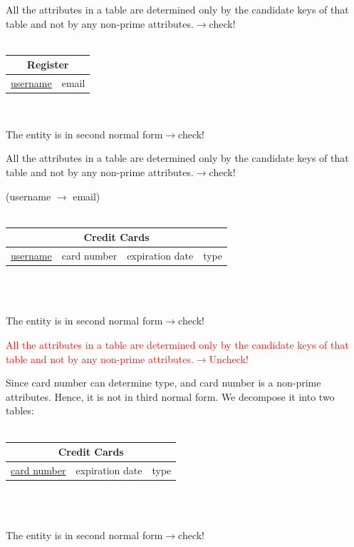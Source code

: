 \documentclass[12pt]{article}
\begin{document}
\par All the attributes in a table are determined only by the candidate keys of that table and not by any non-prime attributes.\hfill $\rightarrow$check!\\
~\\
\begin{tabularx}{\textwidth}{|X|X|}
\hline
\multicolumn{2}{|c|}{Register}\\\hline
\underline{username} & email\\\hline
\end{tabularx}
~\\
\par The entity is in second normal form\hfill $\rightarrow$check!
\par All the attributes in a table are determined only by the candidate keys of that table and not by any non-prime attributes.\hfill $\rightarrow$check!
\par (username $\rightarrow$ email)\\
~\\
\begin{tabularx}{\textwidth}{|X|X|X|X|}
\hline
\multicolumn{4}{|c|}{Credit Cards}\\\hline
\underline{username} & card number & expiration date & type\\\hline
\end{tabularx}
~\\~\\
\par The entity is in second normal form\hfill $\rightarrow$check!
\par \textcolor{red}{All the attributes in a table are determined only by the candidate keys of that table and not by any non-prime attributes.\hfill $\rightarrow$Uncheck!}
\par Since card number can determine type, and card number is a non-prime attributes. Hence, it is not in third normal form. We decompose it into two tables:\\
~\\
\begin{tabularx}{\textwidth}{|X|X|X|}
\hline
\multicolumn{3}{|c|}{Credit Cards}\\\hline
\underline{card number} & expiration date & type\\\hline
\end{tabularx}
~\\~\\
\par The entity is in second normal form\hfill $\rightarrow$check!
\end{document}

